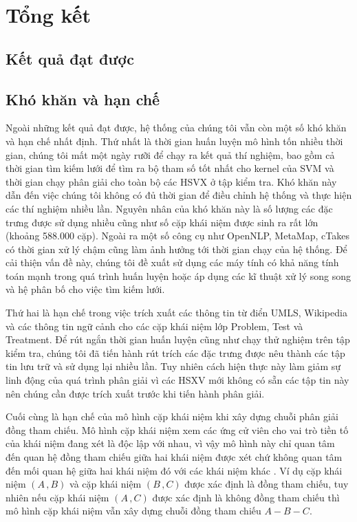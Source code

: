 \chapter{Tổng kết}

\section{Kết quả đạt được}

\section{Khó khăn và hạn chế}
Ngoài những kết quả đạt được, hệ thống của chúng tôi vẫn còn một số khó khăn và hạn chế nhất định. Thứ nhất là thời gian huấn luyện mô hình tốn nhiều thời gian, chúng tôi mất một ngày rưỡi để chạy ra kết quả thí nghiệm, bao gồm cả thời gian tìm kiếm lưới để tìm ra bộ tham số tốt nhất cho kernel của SVM và thời gian chạy phân giải cho toàn bộ các HSVX ở tập kiểm tra. Khó khăn này dẫn đến việc chúng tôi không có đủ thời gian để điều chỉnh hệ thống và thực hiện các thí nghiệm nhiều lần. Nguyên nhân của khó khăn này là số lượng các đặc trưng được sử dụng nhiều cũng như số cặp khái niệm được sinh ra rất lớn (khoảng 588.000 cặp). Ngoài ra một số công cụ như OpenNLP, MetaMap, cTakes có thời gian xử lý chậm cũng làm ảnh hưởng tới thời gian chạy của hệ thống. Để cải thiện vấn đề này, chúng tôi đề xuất sử dụng các máy tính có khả năng tính toán mạnh trong quá trình huấn luyện hoặc áp dụng các kĩ thuật xử lý song song và hệ phân bố cho việc tìm kiếm lưới.

Thứ hai là hạn chế trong việc trích xuất các thông tin từ điển UMLS, Wikipedia và các thông tin ngữ cảnh cho các cặp khái niệm lớp Problem, Test và Treatment. Để rút ngắn thời gian huấn luyện cũng như chạy thử nghiệm trên tập kiểm tra, chúng tôi đã tiến hành rút trích các đặc trưng được nêu thành các tập tin lưu trữ và sử dụng lại nhiều lần. Tuy nhiên cách hiện thực này làm giảm sự linh động của quá trình phân giải vì các HSXV mới không có sẵn các tập tin này nên chúng cần được trích xuất trước khi tiến hành phân giải.

Cuối cùng là hạn chế của mô hình cặp khái niệm khi xây dựng chuỗi phân giải đồng tham chiếu. Mô hình cặp khái niệm xem các ứng cử viên cho vai trò tiền tố của khái niệm đang xét là độc lập với nhau, vì vậy mô hình này chỉ quan tâm đến quan hệ đồng tham chiếu giữa hai khái niệm được xét chứ không quan tâm đến mối quan hệ giữa hai khái niệm đó với các khái niệm khác \cite{VincentNg2010}. Ví dụ cặp khái niệm $(A\,,B)$ và cặp khái niệm $(B\,,C)$ được xác định là đồng tham chiếu, tuy nhiên nếu cặp khái niệm $(A\,,C)$ được xác định là không đồng tham chiếu thì mô hình cặp khái niệm vẫn xây dựng chuỗi đồng tham chiếu $A-B-C$.

